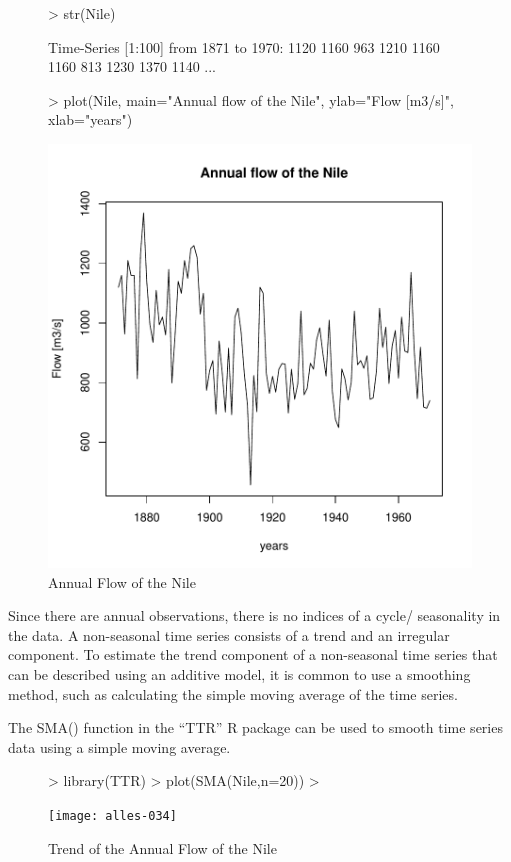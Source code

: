 \documentclass[11pt, a4paper]{article} %
\begin{document}
\begin{figure}
\centering
\begin{Schunk}
\begin{Sinput}
> str(Nile)
\end{Sinput}
\begin{Soutput}
 Time-Series [1:100] from 1871 to 1970: 1120 1160 963 1210 1160 1160 813 1230 1370 1140 ...
\end{Soutput}
\begin{Sinput}
> plot(Nile, main="Annual flow of the Nile", ylab="Flow [m3/s]", xlab="years")
\end{Sinput}
\end{Schunk}
\includegraphics{alles-033}
\caption{Annual Flow of the Nile}
\end{figure}

\noindent Since there are annual observations, there is no indices of a cycle/ seasonality in the data. A non-seasonal time series consists of a trend and an irregular component. 
To estimate the trend component of a non-seasonal time series that can be described using an additive model, it is common to use a smoothing method, such as calculating the simple moving average of the time series.

\noindent The SMA() function in the “TTR” R package can be used to smooth time series data using a simple moving average. 
\begin{figure}
\centering
\begin{Schunk}
\begin{Sinput}
> library(TTR)
> plot(SMA(Nile,n=20))
> 
\end{Sinput}
\end{Schunk}
\texttt{[image: alles-034]}
\caption{Trend of the Annual Flow of the Nile}
\end{figure}
\end{document}
